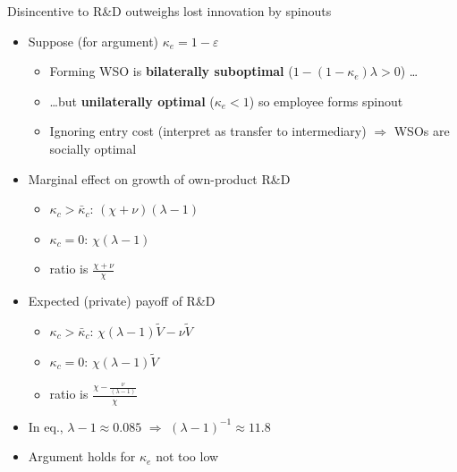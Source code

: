 \documentclass[english,usenames,dvipsnames]{beamer}
\begin{document}
\begin{frame}{Disincentive to R\&D outweighs lost innovation by spinouts}\label{disincentive_outweighs_main}
	\hyperlink{reducing_kappa_c_intuition_overview}{}
	\small
	\begin{itemize}
		\item Suppose (for argument) $\kappa_e = 1 - \varepsilon$
		\begin{itemize}
			\footnotesize
			\item Forming WSO is \alert{\textbf{bilaterally suboptimal}} ($1 - (1-\kappa_e)\lambda > 0$) \ldots
			\item \ldots but \alert{\textbf{unilaterally optimal}} ($\kappa_e < 1$) so employee forms spinout 
			\item Ignoring entry cost (interpret as transfer to intermediary) $\Rightarrow$ WSOs are socially optimal
		\end{itemize}
		\smallskip
		\item Marginal effect on growth of own-product R\&D
		\begin{itemize}
			\footnotesize
			\item $\kappa_c > \bar{\kappa}_c$: $(\chi + \nu)(\lambda -1)$
			\item $\kappa_c = 0$: $\chi (\lambda -1)$
			\item ratio is $\frac{\chi + \nu}{\chi}$
		\end{itemize}
		\smallskip
		\item Expected (private) payoff of R\&D
		\begin{itemize}
			\footnotesize
			\item $\kappa_c > \bar{\kappa}_c$: $\chi (\lambda - 1) \tilde{V} - \nu \tilde{V}$
			\item $\kappa_c = 0$: $\chi (\lambda -1) \tilde{V}$
			\item ratio is $\frac{\chi - \frac{\nu}{(\lambda -1)}}{\chi}$
		\end{itemize}
		\item In eq., $\lambda - 1 \approx 0.085$ $\Rightarrow$ $(\lambda -1)^{-1} \approx 11.8$
		\item Argument holds for $\kappa_e$ not too low \hyperlink{disincentive_outweighs_general}{}
	\end{itemize}
\end{frame}
\end{document}
